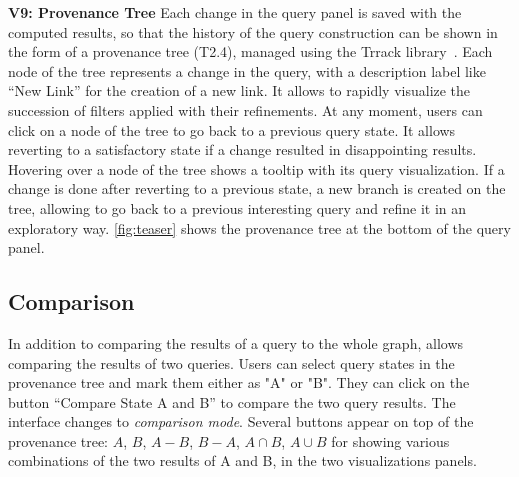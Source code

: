 \noindent\textbf{V9: Provenance Tree}
Each change in the query panel is saved with the computed results, so that the history of the query construction can be shown in the form of a provenance tree (T2.4), managed using the Trrack library~\cite{cutler_trrack_2020}. Each node of the tree represents a change in the query, with a description label like ``New Link'' for the creation of a new link. It allows to rapidly visualize the succession of filters applied with their refinements. At any moment, users can click on a node of the tree to go back to a previous query state. It allows reverting to a satisfactory state if a change resulted in disappointing results. Hovering over a node of the tree shows a tooltip with its query visualization. If a change is done after reverting to a previous state, a new branch is created on the tree, allowing to go back to a previous interesting query and refine it in an exploratory way.  \autoref{fig:teaser} shows the provenance tree at the bottom of the query panel.




\subsection{Comparison}

In addition to comparing the results of a query to the whole graph, \name allows comparing the results of two queries.
Users can select query states in the provenance tree and mark them either as "A" or "B". They can click on the button ``Compare State A and B'' to compare the two query results. The interface changes to \textit{comparison mode}. Several buttons appear on top of the provenance tree: $A$, $B$, $A-B$, $B-A$, $A \cap B$, $A \cup B$ for showing various combinations of the two results of A and B, in the two visualizations panels.


